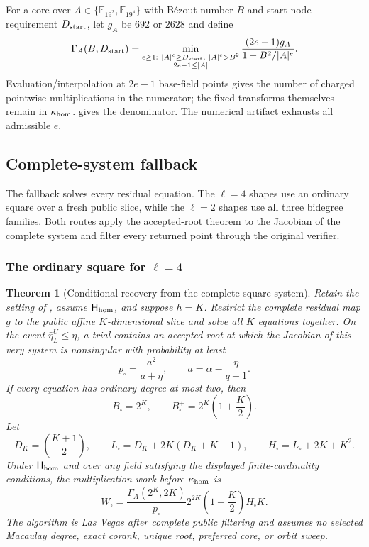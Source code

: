 \documentclass[11pt]{article}
\newtheorem{theorem}{Theorem}[section]
\newcommand{\F}{\mathbb F}
\begin{document}
For a core over $A\in\{\F_{19^2},\F_{19^4}\}$ with B\'ezout number $B$ and
start-node requirement $D_{\rm start}$, let $g_A$ be $692$ or $2628$ and define
\begin{equation}
 \Gamma_A(B,D_{\rm start})=
 \min_{\substack{e\ge1:\ |A|^e\ge D_{\rm start},\
                   |A|^e>B^2\\2e-1\le|A|}}
 \frac{(2e-1)g_A}{1-B^2/|A|^e}.                      \label{eq:sq-gamma}
\end{equation}
Evaluation/interpolation at $2e-1$ base-field points gives the number of
charged pointwise multiplications in the numerator; the fixed transforms
themselves remain in $\kappa_{\rm hom}$.  \Cref{lem:sq-separator} gives the
denominator.  The numerical artifact
exhausts all admissible $e$.


\subsection{Complete-system fallback}
\label{sec:sq-complete-route}

The fallback solves every residual equation.  The $\ell=4$ shapes use an
ordinary square over a fresh public slice, while the $\ell=2$ shapes use all
three bidegree families.  Both routes apply the accepted-root theorem to the
Jacobian of the complete system and filter every returned point through the
original verifier.

\subsubsection{The ordinary square for \texorpdfstring{$\ell=4$}{ell=4}}
\label{sec:sq-complete-square}

\begin{theorem}[Conditional recovery from the complete square system]
\label{thm:sq-direct-square}
Retain the setting of , assume
$\mathsf H_{\rm hom}$, and suppose $h=K$.
Restrict the complete residual map $g$ to the public affine $K$-dimensional
slice and solve all $K$ equations together.  On the event
$\bar\eta_L^U\le\eta$, a trial contains an accepted root at which the
Jacobian of this very system is nonsingular with probability at least
\[
 p_\square=\frac{a^2}{a+\eta},
 \qquad a=\alpha-\frac{\eta}{q-1}.
\]
If every equation has ordinary degree at most two, then
\[
 B_\square=2^K,
 \qquad
 B_\square^+=2^K\left(1+\frac K2\right).
\]
Let
\[
 D_K=\binom{K+1}{2},\qquad
 L_\square=D_K+2K(D_K+K+1),\qquad
 H_\square=L_\square+2K+K^2.
\]
Under $\mathsf H_{\rm hom}$ and over any field satisfying the displayed
finite-cardinality conditions, the multiplication work before
$\kappa_{\rm hom}$ is
\begin{equation}
 W_\square=
 \frac{\Gamma_A(2^K,2K)}{p_\square}
 2^{2K}\left(1+\frac K2\right)H_\square K.
 \label{eq:sq-square-work}
\end{equation}
The algorithm is Las Vegas after complete public filtering and assumes no
selected Macaulay degree, exact corank, unique root, preferred core, or orbit
sweep.
\end{theorem}
\end{document}
